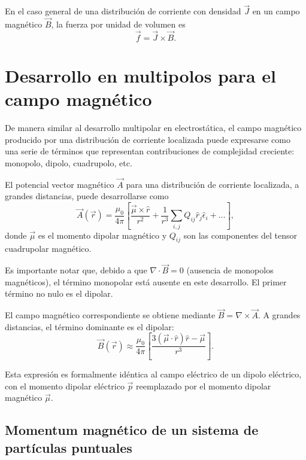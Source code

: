 \documentclass[12pt,a4paper]{book}
\begin{document}
En el caso general de una distribución de corriente con densidad $\vec{J}$ en un campo magnético $\vec{B}$, la fuerza por unidad de volumen es
\begin{equation}
\vec{f} = \vec{J} \times \vec{B}.
\end{equation}

\section{Desarrollo en multipolos para el campo magnético}

De manera similar al desarrollo multipolar en electrostática, el campo magnético producido por una distribución de corriente localizada puede expresarse como una serie de términos que representan contribuciones de complejidad creciente: monopolo, dipolo, cuadrupolo, etc.

El potencial vector magnético $\vec{A}$ para una distribución de corriente localizada, a grandes distancias, puede desarrollarse como
\begin{equation}
\vec{A}(\vec{r}) = \frac{\mu_0}{4\pi} \left[ \frac{\vec{\mu} \times \hat{r}}{r^2} + \frac{1}{r^3} \sum_{i,j} Q_{ij} \hat{r}_j \hat{\epsilon}_i + \ldots \right],
\end{equation}
donde $\vec{\mu}$ es el momento dipolar magnético y $Q_{ij}$ son las componentes del tensor cuadrupolar magnético.

Es importante notar que, debido a que $\nabla \cdot \vec{B} = 0$ (ausencia de monopolos magnéticos), el término monopolar está ausente en este desarrollo. El primer término no nulo es el dipolar.

El campo magnético correspondiente se obtiene mediante $\vec{B} = \nabla \times \vec{A}$. A grandes distancias, el término dominante es el dipolar:
\begin{equation}
\vec{B}(\vec{r}) \approx \frac{\mu_0}{4\pi} \left[ \frac{3(\vec{\mu} \cdot \hat{r})\hat{r} - \vec{\mu}}{r^3} \right].
\end{equation}

Esta expresión es formalmente idéntica al campo eléctrico de un dipolo eléctrico, con el momento dipolar eléctrico $\vec{p}$ reemplazado por el momento dipolar magnético $\vec{\mu}$.

\subsection{Momentum magnético de un sistema de partículas puntuales}
\end{document}
